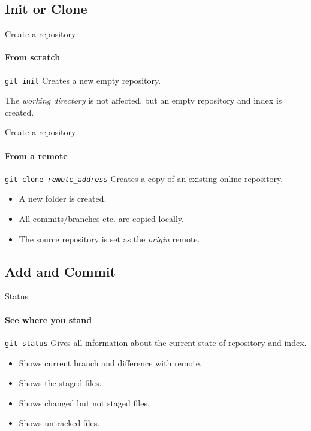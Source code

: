 \documentclass{beamer}
\begin{document}
\subsection{Init or Clone}

\begin{frame}{Create a repository}
\framesubtitle{From scratch}

\begin{block}{	\texttt{git init}}
 	Creates a new empty repository.
 \end{block}

The \emph{working directory} is not affected, but an empty repository and index is created.

\end{frame}

\begin{frame}{Create a repository}
\framesubtitle{From a remote}

\begin{block}{	\texttt{git clone \emph{remote\_address}}}
	Creates a copy of an existing online repository.
\end{block}

\begin{itemize}
	\item A new folder is created.
	\item All commits/branches etc. are copied locally.
	\item The source repository is set as the \emph{origin} remote.
\end{itemize}

\end{frame}

\subsection{Add and Commit}

\begin{frame}{Status}
\framesubtitle{See where you stand}

\begin{block}{	\texttt{git status}}
	Gives all information about the current state of repository and index.
\end{block}

\begin{itemize}
	\item Shows current branch and difference with remote.
	\item Shows the staged files.
	\item Shows changed but not staged files.
	\item Shows untracked files.
\end{itemize}

\end{frame}
\end{document}
